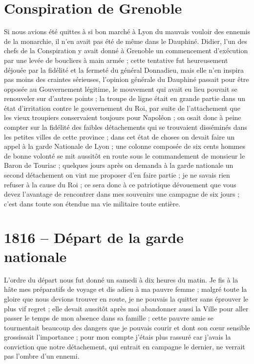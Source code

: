 \documentclass[11pt,a4paper]{report}
\begin{document}
\section*{Conspiration de Grenoble}

Si nous avions été quittes à si bon marché à Lyon du mauvais vouloir des ennemis de la monarchie, il n'en avait pas été de même dans le Dauphiné. Didier, l'un des chefs de la Conspiration y avait donné à Grenoble un commencement d'exécution par une levée de boucliers à main armée ; cette tentative fut heureusement déjouée par la fidélité et la fermeté du général Donnadieu, mais elle n'en inspira pas moins des craintes sérieuses, l'opinion générale du Dauphiné passait pour être opposée au Gouvernement légitime, le mouvement qui avait eu lieu pouvait se renouveler sur d'autres points ; la troupe de ligne était en grande partie dans un état d'irritation contre le gouvernement du Roi, par suite de l'attachement que les vieux troupiers conservaient toujours pour Napoléon ; on osait donc à peine compter sur la fidélité des faibles détachements qui se trouvaient disséminés dans les petites villes de cette province ; dans cet état de choses on devait faire un appel à la garde Nationale de Lyon ; une colonne composée de six cents hommes de bonne volonté se mit aussitôt en route sous le commandement de monsieur le Baron de Touriac ; quelques jours après on demanda à la garde nationale un second détachement on vint me proposer d'en faire partie ; je ne savais rien refuser à la cause du Roi ; ce sera donc à ce patriotique dévouement que vous devez l'avantage de rencontrer dans mes souvenirs une campagne de six jours ; c'est dans toute son étendue ma vie militaire toute entière.

\section*{1816 -- Départ de la garde nationale}

L'ordre du départ nous fut donné un samedi à dix heures du matin. Je fis à la hâte mes préparatifs de voyage et dis adieu à ma pauvre femme ; malgré toute la gloire que nous devions trouver en route, je ne pouvais la quitter sans éprouver le plus vif regret ; elle devait aussitôt après moi abandonner aussi la Ville pour aller passer le temps de mon absence dans sa famille ; cette pauvre amie se tourmentait beaucoup des dangers que je pouvais courir et dont son cœur sensible grossissait l'importance ; pour mon compte j'étais plus rassuré car j'avais la conviction que notre détachement, qui entrait en campagne le dernier, ne verrait pas l'ombre d'un ennemi.
\end{document}

